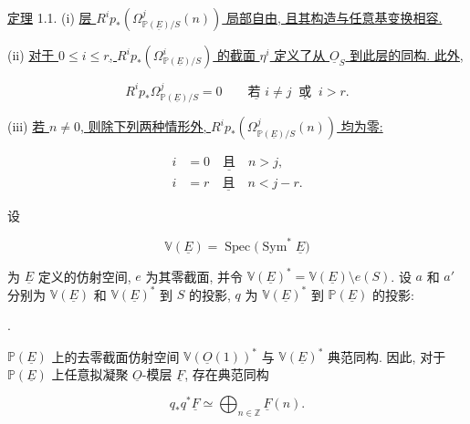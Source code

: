 \underline{定理} 1.1. (i) \underline{层 $R^ip_*(\Omega^j_{\mathbb P(\underline E)/S}(n))$ 局部自由, 且其构造与任意基变换相容.}

(ii) \underline{对于 $0\leq i\leq r$, $R^ip_*(\Omega^i_{\mathbb P(\underline E)/S})$ 的截面 $\eta^i$ 定义了从 $\underline O_S$ 到此层的同构. 此外,}

\begin{equation*}
R^ip_*\Omega^j_{\mathbb P(\underline E)/S}=0
\qquad\underline{\text{若 }}i\ne j\ \underline{\text{ 或 }}\ i>r.
\end{equation*}

(iii) \underline{若 $n\ne0$, 则除下列两种情形外, $R^ip_*(\Omega^j_{\mathbb P(\underline E)/S}(n))$ 均为零:}

\begin{align}
i&=0\quad\underline{\text{且}}\quad n>j,
  \tag{iii$_a$}\\
i&=r\quad\underline{\text{且}}\quad n<j-r.
  \tag{iii$_b$}
\end{align}

设

\begin{equation*}
\mathbb V(\underline E)=\operatorname{Spec}
\bigl(\operatorname{Sym}^*\underline E\bigr)
\end{equation*}

为 $\underline E$ 定义的仿射空间, $e$ 为其零截面, 并令 $\mathbb V(\underline E)^*=\mathbb V(\underline E)\setminus e(S)$. 设 $a$ 和 $a'$ 分别为 $\mathbb V(\underline E)$ 和 $\mathbb V(\underline E)^*$ 到 $S$ 的投影, $q$ 为 $\mathbb V(\underline E)^*$ 到 $\mathbb P(\underline E)$ 的投影:

\begin{center}
\qquad .
\end{center}

$\mathbb P(\underline E)$ 上的去零截面仿射空间 $\mathbb V(\underline O(1))^*$ 与 $\mathbb V(\underline E)^*$ 典范同构. 因此, 对于 $\mathbb P(\underline E)$ 上任意拟凝聚 $\underline O$-模层 $\underline F$, 存在典范同构


\begin{equation}\tag{1.1.1}
q_*q^*\underline F\simeq
\bigoplus_{n\in\mathbb Z}\underline F(n).
\end{equation}

